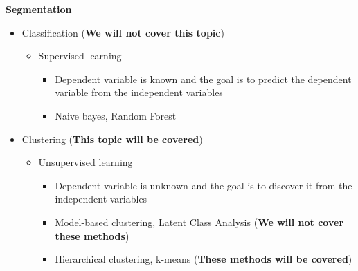 \documentclass[
  ignorenonframetext,
]{beamer}
\begin{document}
\begin{frame}{}
\label{section-7}
\textbf{Segmentation}

\begin{itemize}
\item
  Classification (\textbf{We will not cover this topic})

  \begin{itemize}
  \item
    Supervised learning

    \begin{itemize}
    \item
      Dependent variable is known and the goal is to predict the
      dependent variable from the independent variables
    \item
      Naive bayes, Random Forest
    \end{itemize}
  \end{itemize}
\item
  Clustering (\textbf{This topic will be covered})

  \begin{itemize}
  \item
    Unsupervised learning

    \begin{itemize}
    \item
      Dependent variable is unknown and the goal is to discover it from
      the independent variables
    \item
      Model-based clustering, Latent Class Analysis (\textbf{We will not
      cover these methods})
    \item
      Hierarchical clustering, k-means (\textbf{These methods will be
      covered})
    \end{itemize}
  \end{itemize}
\end{itemize}
\end{frame}
\end{document}
